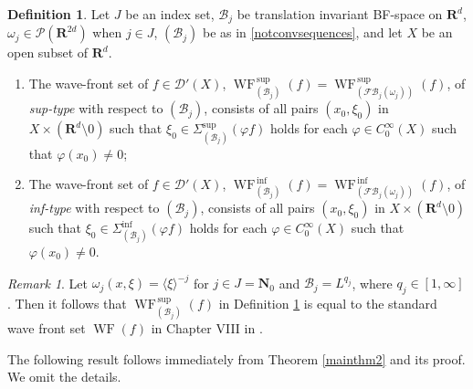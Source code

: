 \documentclass[12pt,a4paper,reqno]{amsart}
\numberwithin{equation}{section}
\numberwithin{thm}{section}
\theoremstyle{definition}
\newtheorem{defn}[thm]{Definition}
\theoremstyle{remark}
\newtheorem{rem}[thm]{Remark}
\begin{document}
\begin{defn}\label{defsuperposWF}
Let $J$ be an index set, $\mathscr B_j$ be translation invariant
BF-space on ${\mathbf R^{d}}$, $\omega _j\in \mathscr P({\mathbf R^{{2d}}})$ when $j\in
J$, $(\mathcal B_j)$ be as in
\eqref{notconvsequences}, and let $X$ be an open subset of ${\mathbf R^{d}}$.
\begin{enumerate}
\item The wave-front set of $f\in \mathscr D'(X)$,
${\operatorname{WF}} ^{\, \sup} _{(\mathcal B_j) }(f) = {\operatorname{WF}} ^{\, \sup} _{({\mathscr F\! \mathscr B}
_j(\omega _j) )}(f)$,
of \emph{sup-type} with respect to $(\mathcal B_j) $,
consists of all pairs
$(x_0,\xi_0)$ in $X\times ({\mathbf R^{d}} {\setminus 0})$ such that
$
\xi _0 \in  \Sigma ^{\sup} _{(\mathcal B_j)} ({\varphi} f)
$
holds for each ${\varphi} \in C_0^\infty (X)$ such that ${\varphi} (x_0)\neq
0$;

{\vspace{0.1cm}}

\item The wave-front set of $f\in \mathscr D'(X)$,
${\operatorname{WF}} ^{\, \inf} _{(\mathcal B_j) }(f) = {\operatorname{WF}} ^{\, \inf} _{({\mathscr F\! \mathscr B}
_j(\omega _j) )}(f)$, of \emph{inf-type} with respect to $(\mathcal
B_j)$, consists of all pairs
$(x_0,\xi_0)$ in $X\times ({\mathbf R^{d}} {\setminus 0})$ such that
$
\xi _0 \in  \Sigma ^{\inf} _{(\mathcal B_j)} ({\varphi} f)
$
holds for each ${\varphi} \in C_0^\infty (X)$ such that ${\varphi} (x_0)\neq
0$.
\end{enumerate}
\end{defn}

\par

\begin{rem}\label{remstandWF}
Let $\omega _j(x,\xi ) = {\langle \xi\rangle} ^{-j}$ for $j\in J=\mathbf
N_0$ and $\mathscr B_j=L^{q_j}$, where $q_j\in [1,\infty ]$. Then it
follows that ${\operatorname{WF}} _{(\mathcal B_j)}^{\, \sup}(f)$ in
Definition \ref{defsuperposWF} is equal to the standard wave front
set ${\operatorname{WF}} (f)$ in Chapter VIII in \cite{Ho1}.
\end{rem}

\par

The following result follows immediately from Theorem \ref{mainthm2}
and its proof. We omit the details.

\par
\end{document}
